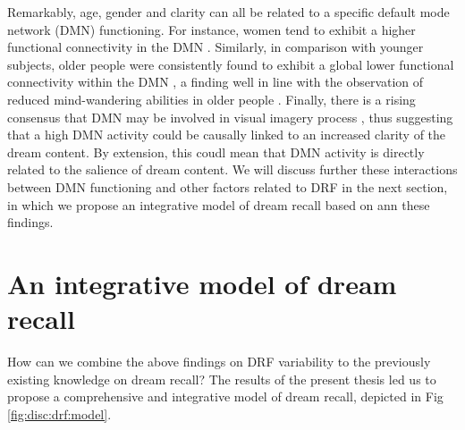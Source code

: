 Remarkably, age, gender and clarity can all be related to a specific default mode network (DMN) functioning. For instance, women tend to exhibit a higher functional connectivity in the DMN \citep{bluhm_default_2008}. Similarly, in comparison with younger subjects, older people were consistently found to exhibit a global lower functional connectivity within the DMN \citep{damoiseaux_reduced_2008, koch_effects_2010}, a finding well in line with the observation of reduced mind-wandering abilities in older people \citep{jackson_mind-wandering_2012}. Finally, there is a rising consensus that DMN may be involved in visual imagery process \citep{andrews-hanna_functional-anatomic_2010}, thus suggesting that a high DMN activity could be causally linked to an increased clarity of the dream content. By extension, this coudl mean that DMN activity is directly related to the salience of dream content. We will discuss further these interactions between DMN functioning and other factors related to DRF in the next section, in which we propose an integrative model of dream recall based on ann these findings.

\section{An integrative model of dream recall}
\label{disc:drf:model}

How can we combine the above findings on DRF variability to the previously existing knowledge on dream recall?
The results of the present thesis led us to propose a comprehensive and integrative model of dream recall, depicted in Fig \ref{fig:disc:drf:model}.

